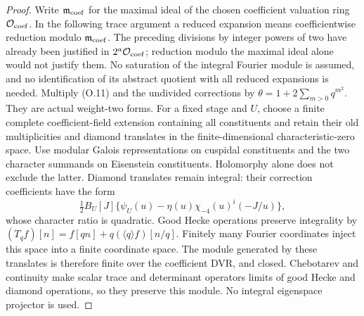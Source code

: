 \documentclass[11pt]{article}
\theoremstyle{definition}
\theoremstyle{remark}
\begin{document}
\begin{proof}
Write $\mathfrak m_{\rm coef}$ for the maximal ideal of the chosen
coefficient valuation ring $\mathcal O_{\rm coef}$. In the following
trace argument a reduced expansion means coefficientwise reduction
modulo $\mathfrak m_{\rm coef}$. The preceding divisions by integer
powers of two have already been justified in $2^a\mathcal O_{\rm coef}$;
reduction modulo the maximal ideal alone would not justify them.
No saturation of the integral Fourier module is assumed, and no
identification of its abstract quotient with all reduced expansions
is needed.
Multiply (O.11) and the undivided corrections by
$\theta=1+2\sum_{m>0}q^{m^2}$. They are actual weight-two forms.
For a fixed stage and $U$, choose a finite complete coefficient-field
extension containing all constituents and retain their old
multiplicities and diamond translates in the finite-dimensional
characteristic-zero space. Use modular Galois representations on
cuspidal constituents and the two character summands on Eisenstein
constituents. Holomorphy alone does not exclude the latter.
Diamond translates remain integral:
their correction coefficients have the form
\[
 \tfrac12 B_U[J]\{\psi_U(u)-\eta(u)\chi_{-4}(u)^i(-J/u)\},
\]
whose character ratio is quadratic. Good Hecke operations preserve
integrality by
$(T_qf)[n]=f[qn]+q(\langle q\rangle f)[n/q]$.
Finitely many Fourier coordinates inject this space into a finite
coordinate space. The module generated by these translates is
therefore finite over the coefficient DVR, and closed.
Chebotarev and continuity make scalar trace and determinant
operators limits of good Hecke and diamond operations, so they
preserve this module. No integral eigenspace projector is used.


\end{proof}
\end{document}
